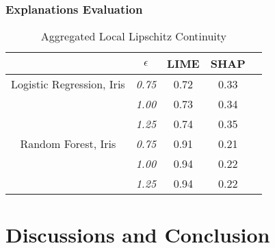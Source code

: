 \documentclass[english]{tktltiki2}
\theoremstyle{definition}
\theoremstyle{remark}
\begin{document}
\subsubsection{Explanations Evaluation}
\begin{table}[H]
	\caption{Aggregated Local Lipschitz Continuity}
	\label{tab:quantitative_experimentation_iris}
	\begin{center}
		\begin{tabular}{@{}ccccc@{}}
			\toprule
			& $\epsilon$ & LIME & SHAP \\ \midrule
			
			\multicolumn{1}{|c|}{Logistic Regression, Iris} &  \multicolumn{1}{c|}{\textit{0.75}} &  \multicolumn{1}{c|}{0.72} & \multicolumn{1}{c|}{0.33} \\ 
			\midrule
			
			\multicolumn{1}{|c|}{} &  \multicolumn{1}{c|}{\textit{1.00}} &  \multicolumn{1}{c|}{0.73} & \multicolumn{1}{c|}{0.34} \\ 
			\midrule 
			
			\multicolumn{1}{|c|}{} &  \multicolumn{1}{c|}{\textit{1.25}} & \multicolumn{1}{c|}{0.74} & \multicolumn{1}{c|}{0.35} \\ 
			\midrule 		
			
			\multicolumn{1}{|c|}{Random Forest, Iris} &  \multicolumn{1}{c|}{\textit{0.75}} &  \multicolumn{1}{c|}{0.91} & \multicolumn{1}{c|}{0.21} \\ 
			\midrule
			
			\multicolumn{1}{|c|}{} &  \multicolumn{1}{c|}{\textit{1.00}} &  \multicolumn{1}{c|}{0.94} & \multicolumn{1}{c|}{0.22} \\ 
			\midrule 
			
			\multicolumn{1}{|c|}{} &  \multicolumn{1}{c|}{\textit{1.25}} & \multicolumn{1}{c|}{0.94} & \multicolumn{1}{c|}{0.22} \\ 
			\midrule 		
		
		\end{tabular}
	\end{center}
\end{table}

\section{Discussions and Conclusion} %
\end{document}
